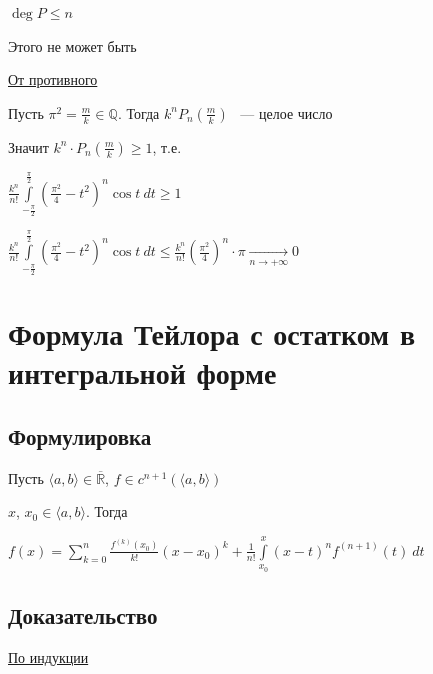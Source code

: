 \documentclass{article}
\begin{document}
			$\deg P \leq n$
			
			Этого не может быть
			
			\underline{От противного}
			
			Пусть $\pi^2 = \frac{m}{k} \in \mathbb{Q}$. Тогда $k^n P_n(\frac{m}{k})$ ~--- целое число
			
			Значит $k^n \cdot P_n (\frac{m}{k}) \geq 1$, т.е.
			
			$\frac{k^n}{n!} \int\limits^{\frac{\pi}{2}}_{-\frac{\pi}{2}} (\frac{\pi^2}{4} - t^2)^n \cos t \ dt \geq 1$
			
			$\frac{k^n}{n!} \int\limits^{\frac{\pi}{2}}_{-\frac{\pi}{2}} (\frac{\pi^2}{4} - t^2)^n \cos t \ dt \leq \frac{k^n}{n!} (\frac{\pi^2}{4})^n \cdot \pi \xrightarrow[n \rightarrow +\infty]{} 0$
			
	\newpage
	
	\newpage

	\section{Формула Тейлора с остатком в интегральной форме}


		\subsection{Формулировка}

			Пусть $\langle a, b \rangle \in \overline{\mathbb{R}}$, $f \in c^{n + 1} (\langle a, b \rangle)$

			$x$, $x_0 \in \langle a, b \rangle$. Тогда

			$f(x) = \sum\limits^n_{k = 0} \frac{f^{(k)} (x_0)}{k!} (x - x_0)^k + \frac{1}{n!} \int\limits^x_{x_0} (x - t)^n f^{(n + 1)}(t) \ dt$

		\subsection{Доказательство}

			\underline{По индукции}
\end{document}
